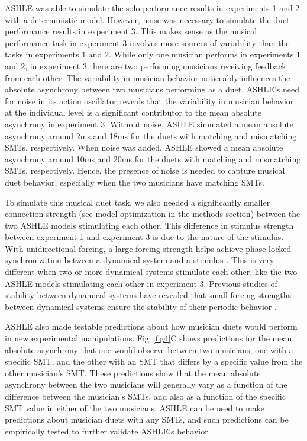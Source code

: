 \documentclass[10pt,letterpaper]{article}
\begin{document}
ASHLE was able to simulate the solo performance results in experiments 1 and 2 with a deterministic model. However, noise was necessary to simulate the duet performance results in experiment 3. This makes sense as the musical performance task in experiment 3 involves more sources of variability than the tasks in experiments 1 and 2. While only one musician performs in experiments 1 and 2, in experiment 3 there are two performing musicians receiving feedback from each other. The variability in musician behavior noticeably influences the absolute asynchrony between two musicians performing as a duet. ASHLE's need for noise in its action oscillator reveals that the variability in musician behavior at the individual level is a significant contributor to the mean absolute asynchrony in experiment 3. Without noise, ASHLE simulated a mean absolute asynchrony around 2ms and 18ms for the duets with matching and mismatching SMTs, respectively. When noise was added, ASHLE showed a mean absolute asynchrony around 10ms and 20ms for the duets with matching and mismatching SMTs, respectively. Hence, the presence of noise is needed to capture musical duet behavior, especially when the two musicians have matching SMTs.

To simulate this musical duet task, we also needed a significantly smaller connection strength (see model optimization in the methods section) between the two ASHLE models stimulating each other. This difference in stimulus strength between experiment 1 and experiment 3 is due to the nature of the stimulus. With unidirectional forcing, a large forcing strength helps achieve phase-locked synchronization between a dynamical system and a stimulus \cite{kim2015signal}. This is very different when two or more dynamical systems stimulate each other, like the two ASHLE models stimulating each other in experiment 3. Previous studies of stability between dynamical systems have revealed that small forcing strengths between dynamical systems ensure the stability of their periodic behavior \cite{kim2015signal}.

ASHLE also made testable predictions about how musician duets would perform in new experimental manipulations. Fig~\ref{fig4}C shows predictions for the mean absolute asynchrony that one would observe between two musicians, one with a specific SMT, and the other with an SMT that differs by a specific value from the other musician's SMT. These predictions show that the mean absolute asynchrony between the two musicians will generally vary as a function of the difference between the musician's SMTs, and also as a function of the specific SMT value in either of the two musicians. ASHLE can be used to make predictions about musician duets with any SMTs, and such predictions can be empirically tested to further validate ASHLE's behavior.
\end{document}
